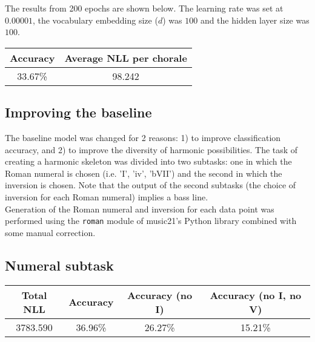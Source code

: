 \documentclass[12pt]{article}
\begin{document}
The results from 200 epochs are shown below. The learning rate was set at $0.00001$, the vocabulary embedding size ($d$) was $100$ and the hidden layer size was $100$. 

\begin{center}
  \begin{tabular}{ c | c }
    Accuracy & Average NLL per chorale \\ \hline
    33.67\% & 98.242
  \end{tabular}
\end{center}

\subsection{Improving the baseline}

The baseline model was changed for 2 reasons: 1) to improve classification accuracy, and 2) to improve the diversity of harmonic possibilities. The task of creating a harmonic skeleton was divided into two subtasks: one in which the Roman numeral is chosen (i.e. 'I', 'iv', 'bVII') and the second in which the inversion is chosen. Note that the output of the second subtasks (the choice of inversion for each Roman numeral) implies a bass line.\\
Generation of the Roman numeral and inversion for each data point was performed using the \texttt{roman} module of music21's Python library combined with some manual correction.

\begin{center}
\end{center}

\subsection{Numeral subtask}

\begin{center}
	\begin{tabular}{ c | c | c | c }
		\textbf{Total NLL} & \textbf{Accuracy} & \textbf{Accuracy (no I)} & \textbf{Accuracy (no I, no V)} \\ \hline
		3783.590 & 36.96\% & 26.27\% & 15.21\%
	\end{tabular}
\end{center}	 
\end{document}
